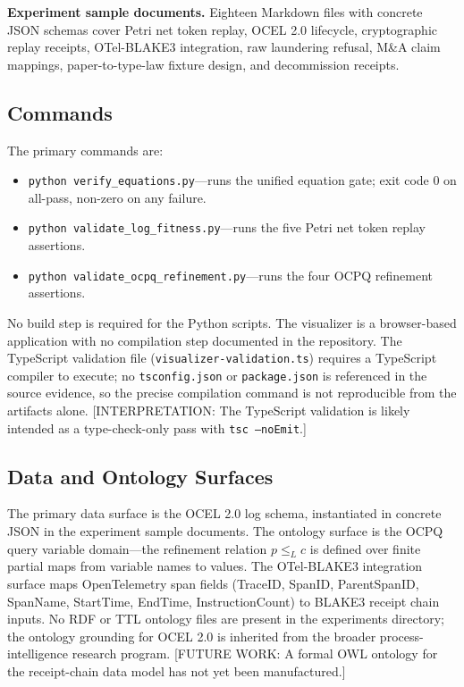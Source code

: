 \textbf{Experiment sample documents.} Eighteen Markdown files with concrete JSON
schemas cover Petri net token replay, OCEL 2.0 lifecycle, cryptographic replay
receipts, OTel-BLAKE3 integration, raw laundering refusal, M\&A claim mappings,
paper-to-type-law fixture design, and decommission receipts.

\subsection{Commands}
\label{sec:experiments-core-impl-commands}

The primary commands are:

\begin{itemize}
  \item \texttt{python verify\_equations.py}---runs the unified equation gate; exit
    code 0 on all-pass, non-zero on any failure.
  \item \texttt{python validate\_log\_fitness.py}---runs the five Petri net token
    replay assertions.
  \item \texttt{python validate\_ocpq\_refinement.py}---runs the four OCPQ refinement
    assertions.
\end{itemize}

No build step is required for the Python scripts. The visualizer is a browser-based
application with no compilation step documented in the repository. The TypeScript
validation file (\texttt{visualizer-validation.ts}) requires a TypeScript compiler
to execute; no \texttt{tsconfig.json} or \texttt{package.json} is referenced in the
source evidence, so the precise compilation command is not reproducible from the
artifacts alone. [INTERPRETATION: The TypeScript validation is likely intended as a
type-check-only pass with \texttt{tsc --noEmit}.]

\subsection{Data and Ontology Surfaces}
\label{sec:experiments-core-impl-data}

The primary data surface is the OCEL 2.0 log schema, instantiated in concrete JSON
in the experiment sample documents. The ontology surface is the OCPQ query variable
domain---the refinement relation $p \leq_L c$ is defined over finite partial maps
from variable names to values. The OTel-BLAKE3 integration surface maps OpenTelemetry
span fields (TraceID, SpanID, ParentSpanID, SpanName, StartTime, EndTime,
InstructionCount) to BLAKE3 receipt chain inputs. No RDF or TTL ontology files
are present in the experiments directory; the ontology grounding for OCEL 2.0
is inherited from the broader process-intelligence research program. [FUTURE WORK:
A formal OWL ontology for the receipt-chain data model has not yet been manufactured.]


